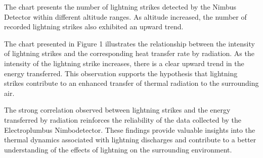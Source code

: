 \documentclass[english]{cenarticle}
\begin{document}
\begin{center}
\end{center}

The chart presents the number of lightning strikes detected by the Nimbus Detector within different altitude ranges. As altitude increased, the number of recorded lightning strikes also exhibited an upward trend.

The chart presented in Figure 1 illustrates the relationship between the intensity of lightning strikes and the corresponding heat transfer rate by radiation. As the intensity of the lightning strike increases, there is a clear upward trend in the energy transferred. This observation supports the hypothesis that lightning strikes contribute to an enhanced transfer of thermal radiation to the surrounding air.

The strong correlation observed between lightning strikes and the energy transferred by radiation reinforces the reliability of the data collected by the Electroplumbus Nimbodetector. These findings provide valuable insights into the thermal dynamics associated with lightning discharges and contribute to a better understanding of the effects of lightning on the surrounding environment.
\end{document}
